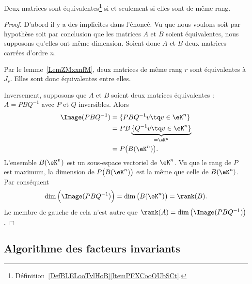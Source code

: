\begin{corollary}      \label{CorGOUYooErfOIe}
	Deux matrices sont équivalentes\footnote{Définition~\ref{DefBLELooTvlHoB}\ref{ItemPFXCooOUbSCt}.} si et seulement si elles sont de même rang.
\end{corollary}

\begin{proof}
	D'abord il y a des implicites dans l'énoncé. Vu que nous voulons soit par hypothèse soit par conclusion que les matrices \( A\) et \( B\) soient équivalentes, nous supposons qu'elles ont même dimension. Soient donc \( A\) et \( B\) deux matrices carrées d'ordre \( n \).

	Par le lemme~\ref{LemZMxxnfM}, deux matrices de même rang \( r\) sont équivalentes à \( J_r\). Elles sont donc équivalentes entre elles.

	Inversement, supposons que \( A\) et \( B\) soient deux matrices équivalentes : \( A=PBQ^{-1}\) avec \( P\) et \( Q\) inversibles. Alors
	\begin{subequations}
		\begin{align}
			\Image(PBQ^{-1}) & =\{ PBQ^{-1}v\tq v\in \eK^n \}                       \\
			                 & =PB\underbrace{\{ Q^{-1}v\tq v\in \eK^n \}}_{=\eK^n} \\
			                 & =P\big( B(\eK^n) \big).
		\end{align}
	\end{subequations}
	L'ensemble \( B(\eK^n)\) est un sous-espace vectoriel de \( \eK^n\). Vu que le rang de \( P\) est maximum, la dimension de \( P\big( B(\eK^n) \big)\) est la même que celle de \( B(\eK^n)\). Par conséquent
	\begin{equation}
		\dim\Big( \Image(PBQ^{-1}) \Big)=\dim\big( B(\eK^n) \big)=\rank(B).
	\end{equation}
	Le membre de gauche de cela n'est autre que \( \rank(A)=\dim\big( \Image(PBQ^{-1}) \big)\).
\end{proof}

\subsection{Algorithme des facteurs invariants}

